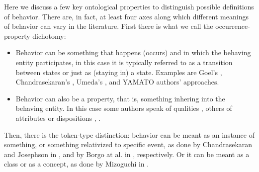 \documentclass[sw]{iosart2x}
\newcommand{\YAMATO}{\textsc{YAMATO}\xspace}
\newcommand{\stateVarCond}[1]{%
  \ifthenelse{\equal{#1}{fullSingular}}{system condition}{%
    \ifthenelse{\equal{#1}{shortSingular}}{condition}{%
      \ifthenelse{\equal{#1}{fullPlural}}{system conditions}{%
        \ifthenelse{\equal{#1}{shortPlural}}{conditions}{%
          ERROR!%
        }%
      }%
    }%
  }%
}
\newcommand{\TODO}[1]{{\color{red} #1}}
\begin{document}

{%
Here we discuss a few key ontological properties to distinguish possible definitions of behavior.
There are, in fact, at least four %
axes along which different meanings of behavior can vary in the literature.
First there is what we call the occurrence-property dichotomy:
\begin{itemize}
  \item Behavior can be something that happens (occurs) and in which the behaving entity participates, 
  in this case it is typically referred to as a transition between states or just as (staying in) a state. 
  Examples are Goel's \cite{goelStructureBehaviorFunction2009}, Chandrasekaran's \cite{chandrasekaranFunctionDeviceRepresentation2000}, Umeda's \cite{umedaFunctionBehaviourStructure1990}, and \YAMATO authors' \cite{mizoguchiFunctionalOntologyArtifacts2009} approaches.
  \item Behavior can also be a property, that is, something inhering into the behaving entity. 
  In this case some authors speak of qualities \cite{borgoFormalOntologicalPerspective2009}, others of attributes or dispositions \cite{vermaasConceptualFrameworkJohn2007}, \cite{geroCategorisingTechnologicalKnowledge2002}.
\end{itemize} 

Then, there is the token-type distinction: behavior %
can be meant as an instance of something, or something relativized to specific event, as done by Chandrasekaran and Josephson in \cite{chandrasekaranFunctionDeviceRepresentation2000}, and by Borgo at al. in \cite{borgoFormalOntologicalPerspective2009}, respectively. Or it can be meant as a class or as a concept, as done by Mizoguchi in \cite{mizoguchiFunctionalOntologyArtifacts2009}.

}
\end{document}
